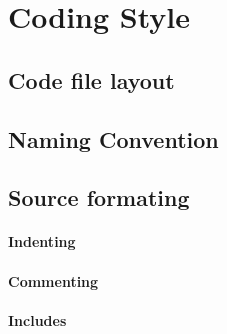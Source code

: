 \section{Coding Style}
\paragraph{}

\subsection{Code file layout}
\paragraph{}

\subsection{Naming Convention}
\paragraph{}


\subsection{Source formating}
\paragraph{}


\paragraph{Indenting}


\paragraph{Commenting}


\paragraph{Includes}

